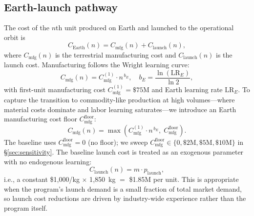 \documentclass[preprint,12pt]{elsarticle}
\begin{document}
\subsection{Earth-launch pathway}

The cost of the $n$th unit produced on Earth and launched to the operational orbit is
\begin{equation}
  C_{\mathrm{Earth}}(n) = C_{\mathrm{mfg}}(n) + C_{\mathrm{launch}}(n),
  \label{eq:earth_unit}
\end{equation}
where $C_{\mathrm{mfg}}(n)$ is the terrestrial manufacturing cost and $C_{\mathrm{launch}}(n)$ is the launch cost. Manufacturing follows the Wright learning curve:
\begin{equation}
  C_{\mathrm{mfg}}(n) = C_{\mathrm{mfg}}^{(1)} \cdot n^{\,b_E}, \quad b_E = \frac{\ln(\mathrm{LR}_E)}{\ln 2},
  \label{eq:earth_mfg}
\end{equation}
with first-unit manufacturing cost $C_{\mathrm{mfg}}^{(1)} = \$75$M and Earth learning rate $\mathrm{LR}_E$. To capture the transition to commodity-like production at high volumes---where material costs dominate and labor learning saturates---we introduce an Earth manufacturing cost floor $C_{\mathrm{mfg}}^{\mathrm{floor}}$:
\begin{equation}
  C_{\mathrm{mfg}}(n) = \max\!\left(C_{\mathrm{mfg}}^{(1)} \cdot n^{\,b_E},\; C_{\mathrm{mfg}}^{\mathrm{floor}}\right).
  \label{eq:earth_mfg_floor}
\end{equation}
The baseline uses $C_{\mathrm{mfg}}^{\mathrm{floor}} = 0$ (no floor); we sweep $C_{\mathrm{mfg}}^{\mathrm{floor}} \in \{0, \$2\text{M}, \$5\text{M}, \$10\text{M}\}$ in \S\ref{sec:sensitivity}. The baseline launch cost is treated as an exogenous parameter with no endogenous learning:
\begin{equation}
  C_{\mathrm{launch}}(n) = m \cdot p_{\mathrm{launch}},
  \label{eq:earth_launch_baseline}
\end{equation}
i.e., a constant \$1{,}000/kg $\times$ 1{,}850~kg $=$ \$1.85M per unit. This is appropriate when the program's launch demand is a small fraction of total market demand, so launch cost reductions are driven by industry-wide experience rather than the program itself.
\end{document}
